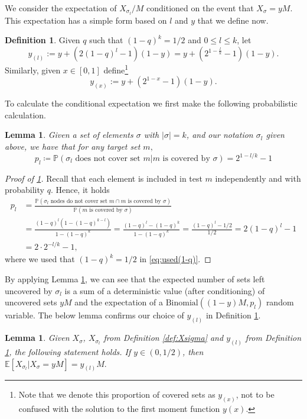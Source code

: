 \documentclass[12pt,reqno]{amsart}
\numberwithin{equation}{section}
\newtheorem{lemma}[theorem]{Lemma}
\theoremstyle{definition}
\newtheorem{definition}[theorem]{Definition}
\newcommand{\E}{\mathbb{E}}
\renewcommand{\P}{\mathbb{P}}
\newcommand{\Bi}[1]{\ensuremath{\text{Binomial}\left(#1\right)}}
\renewcommand{\[}{\begin{equation}}
\renewcommand{\]}{\end{equation}}
\renewcommand{\|}{\bigg{|}}
\begin{document}
We consider the expectation of $X_{\sigma_l}/M$ conditioned on the event that $X_{\sigma} = yM$. This expectation has a simple form based on $l$ and $y$ that we define now.
\begin{definition}\label{def:SubsetProp}
Given $q$ such that $(1-q)^k = 1/2$ and $0\leq l \leq k$, let
\begin{equation}
    y_{(l)} := y + (2(1-q)^l - 1)(1-y) = y + (2^{1-\frac{l}{k}} - 1)(1-y)\label{gamma l}.
\end{equation}
Similarly, given $x \in [0,1]$ define\footnote{Note that we denote this proportion of covered sets as $y_{(x)}$, not to be confused with the solution to the first moment function $y(x)$.}
\[y_{(x)} := y + (2^{1-x}-1)(1-y)\label{def:gammaeps}.\] 
\end{definition}
To calculate the conditional expectation we first make the following probabilistic calculation.
\begin{lemma}\label{lem:p_l}
    Given a set of elements $\sigma$ with $|\sigma| = k$, and our notation $\sigma_l$ given above, we have that for any target set $m,$ \[p_l \coloneqq \P(\sigma_l \text{ does not cover set } m | m \text{ is covered by $\sigma$}) = 2^{1-l/k} - 1\]
\end{lemma}

\begin{proof}[Proof of \ref{lem:p_l}]Recall that each element is included in test $m$ independently and with probability $q$. Hence, it holds
    \begin{align}
        p_l &= \frac{\P(\sigma_l \text{ nodes do not cover set } m \cap m \text{ is covered by $\sigma$})}{\P(m \text{ is covered by $\sigma$})}\\
        &= \frac{(1-q)^l(1-(1-q)^{k-l})}{1-(1-q)^k} = \frac{(1-q)^l-(1-q)^{k}}{1-(1-q)^k} = \frac{(1-q)^l-1/2}{1/2} = 2(1-q)^l - 1\\
        &= 2 \cdot 2^{-l/k} - 1,\label{eq:used(1-q)}
    \end{align}where we used that $(1-q)^k = 1/2$ in \eqref{eq:used(1-q)}.
\end{proof}
By applying Lemma \ref{lem:p_l}, we can see that the expected number of sets left uncovered by $\sigma_l$ is a sum of a deterministic value (after conditioning) of uncovered sets $yM$ and the expectation of a $\Bi{(1-y)M, p_l}$ random variable. The below lemma confirms our choice of $y_{(l)}$ in Definition \ref{def:SubsetProp}.

\begin{lemma}\label{lem:gammaepsexp}
    Given $X_{\sigma}$, $X_{\sigma_l}$ from Definition \ref{def:Xsigma} and $y_{(l)}$ from Definition \ref{def:SubsetProp}, the following statement holds. If $y \in (0,1/2)$, then $\E[X_{\sigma_l} | X_{\sigma} = y M] = y_{(l)} M.$
\end{lemma}
    
\end{document}
